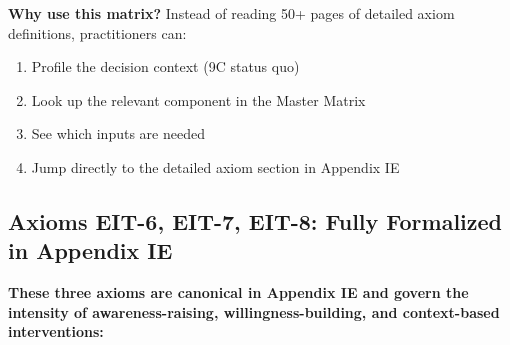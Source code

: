 \textbf{Why use this matrix?} Instead of reading 50+ pages of detailed axiom definitions, practitioners can:
\begin{enumerate}[nosep]
\item Profile the decision context (9C status quo)
\item Look up the relevant component in the Master Matrix
\item See which inputs are needed
\item Jump directly to the detailed axiom section in Appendix IE
\end{enumerate}

\subsection{Axioms EIT-6, EIT-7, EIT-8: Fully Formalized in Appendix IE}

\textbf{These three axioms are canonical in Appendix IE and govern the intensity of awareness-raising, willingness-building, and context-based interventions:}

